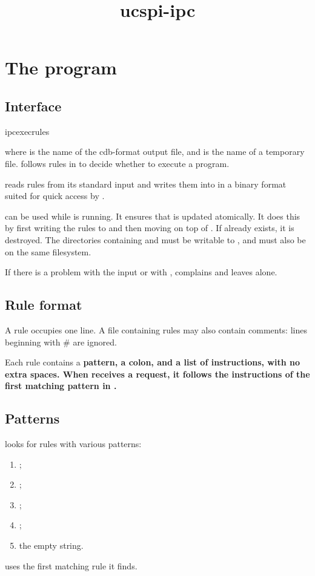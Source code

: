 \documentclass{book}
\title{ucspi-ipc}
\begin{document}
\section{The  program}

\subsection{Interface}
\begin{code}%
  ipcexecrules  
\end{code}
where  is the name of the cdb-format output file, and
 is the name of a temporary file.
 follows rules in  to decide whether to
execute a program.

 reads rules from its standard input and writes them
into  in a binary format suited for quick access by
.

 can be used while  is running.  It
ensures that  is updated atomically.  It does this by first
writing the rules to  and then moving  on top of
.  If  already exists, it is destroyed.  The
directories containing  and  must be writable to
, and must also be on the same filesystem.

If there is a problem with the input or with , 
complains and leaves  alone.

\subsection{Rule format}
A rule occupies one line.  A file containing rules may also contain
comments: lines beginning with \# are ignored.

Each rule contains a \bf{pattern}, a colon, and a list of
\bf{instructions}, with no extra spaces.  When  receives a
request, it follows the instructions of the first matching pattern in
.

\subsection{Patterns}
 looks for rules with various patterns:
\begin{enumerate}
\item {};
\item {};
\item {};
\item {};
\item the empty string.
\end{enumerate}
 uses the first matching rule it finds.
\end{document}
